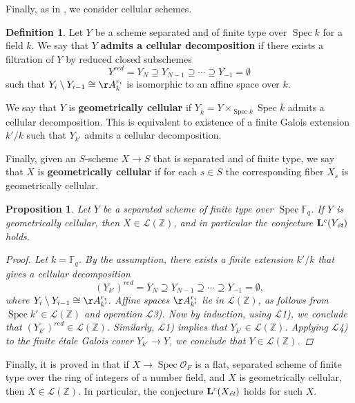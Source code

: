 \documentclass[draft,leqno,12pt]{article}
\theoremstyle{plain}
\newtheorem{proposition}[theorem]{\indent\sc Proposition}
\theoremstyle{definition}
\newtheorem{definition}[theorem]{\indent\sc Definition}
\DeclareMathOperator{\Spec}{Spec}
\newcommand{\ZZ}{\mathbb{Z}}
\newcommand{\FF}{\mathbb{F}}
\newcommand{\et}{\text{\it \'{e}t}}
\begin{document}
Finally, as in \cite[\S 5.4]{Morin-2014}, we consider cellular schemes.

\begin{definition}
  Let $Y$ be a scheme separated and of finite type over $\Spec k$ for a field
  $k$. We say that $Y$ \textbf{admits a cellular decomposition} if there exists
  a filtration of $Y$ by reduced closed subschemes
  $$Y^{red} = Y_N \supseteq Y_{N-1} \supseteq \cdots \supseteq Y_{-1} = \emptyset$$
  such that $Y_i\setminus Y_{i-1} \cong \AA^{r_i}_k$ is isomorphic to an affine
  space over $k$.

  We say that $Y$ is \textbf{geometrically cellular} if
  $Y_{\overline{k}} = Y \times_{\Spec k} \Spec \overline{k}$ admits a cellular
  decomposition. This is equivalent to existence of a finite Galois extension
  $k'/k$ such that $Y_{k'}$ admits a cellular decomposition.

  Finally, given an $S$-scheme $X \to S$ that is separated and of finite type,
  we say that $X$ is \textbf{geometrically cellular} if for each $s \in S$ the
  corresponding fiber $X_s$ is geometrically cellular.
\end{definition}

\begin{proposition}
  Let $Y$ be a separated scheme of finite type over $\Spec \FF_q$.
  If $Y$ is geometrically cellular, then $X \in \mathcal{L} (\ZZ)$,
  and in particular the conjecture $\mathbf{L}^c (Y_\et)$ holds.

  \begin{proof}
    Let $k = \FF_q$. By the assumption, there exists a finite extension $k'/k$
    that gives a cellular decomposition
    $$(Y_{k'})^{red} = Y_N \supseteq Y_{N-1} \supseteq \cdots \supseteq Y_{-1} = \emptyset,$$
    where $Y_i \setminus Y_{i-1} \cong \AA^{r_i}_{k'}$. Affine spaces
    $\AA^{r_i}_{k'}$ lie in $\mathcal{L} (\ZZ)$, as follows from
    $\Spec k' \in \mathcal{L} (\ZZ)$ and operation $\mathcal{L}$3). Now by
    induction, using $\mathcal{L}$1), we conclude that
    $(Y_{k'})^{red} \in \mathcal{L} (\ZZ)$. Similarly, $\mathcal{L}$1) implies
    that $Y_{k'} \in \mathcal{L} (\ZZ)$. Applying $\mathcal{L}$4) to the finite
    \'{e}tale Galois cover $Y_{k'} \to Y$, we conclude that
    $Y \in \mathcal{L} (\ZZ)$.
  \end{proof}
\end{proposition}

Finally, it is proved in \cite[Proposition~5.14]{Morin-2014} that if
$X \to \Spec \mathcal{O}_F$ is a flat, separated scheme of finite type over the
ring of integers of a number field, and $X$ is geometrically cellular, then
$X \in \mathcal{L} (\ZZ)$. In particular, the conjecture $\mathbf{L}^c (X_\et)$
holds for such $X$.
\end{document}
